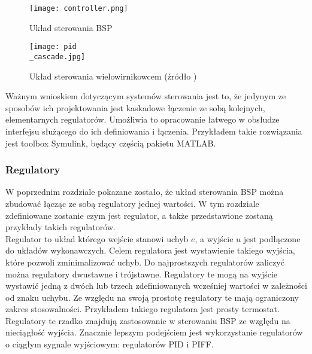 \begin{figure}[!h]
   	\centering
      	\texttt{[image: controller.png]}
      	\caption{Układ sterowania BSP}
      	\label{control_3_stage}
\end{figure}

\begin{figure}[!h]
   	\centering
      	\texttt{[image: pid\\\_cascade.jpg]}
      	\caption{Układ sterowania wielowirnikowcem (źródło \cite{energies})}
      	\label{pid_ladder}
\end{figure}

Ważnym wnioskiem dotyczącym systemów sterowania jest to, że jedynym ze sposobów ich projektowania jest kaskadowe łączenie ze sobą kolejnych, elementarnych regulatorów. Umożliwia to opracowanie łatwego w obsłudze interfejsu służącego do ich definiowania i łączenia. Przykładem takie rozwiązania jest toolbox Symulink, będący częścią pakietu MATLAB.

\subsubsection{Regulatory}

W poprzednim rozdziale pokazane zostało, że układ sterowania BSP można zbudować łącząc ze sobą regulatory jednej wartości. W tym rozdziale zdefiniowane zostanie czym jest regulator, a także przedstawione zostaną przykłady takich regulatorów.\\

Regulator to układ którego wejście stanowi uchyb $e$, a wyjście $u$ jest podłączone do układów wykonawczych. Celem regulatora jest wystawienie takiego wyjścia, które pozwoli zminimalizować uchyb. Do najprostszych regulatorów zaliczyć można regulatory dwustawne i trójstawne. Regulatory te mogą na wyjście wystawić jedną z dwóch lub trzech zdefiniowanych wcześniej wartości w zależności od znaku uchybu. Ze względu na swoją prostotę regulatory te mają ograniczony zakres stosowalności. Przykładem takiego regulatora jest prosty termostat. Regulatory te rzadko znajdują zastosowanie w sterowaniu BSP ze względu na nieciągłość wyjścia. Znacznie lepszym podejściem jest wykorzystanie regulatorów o ciągłym sygnale wyjściowym: regulatorów PID i PIFF.\\

